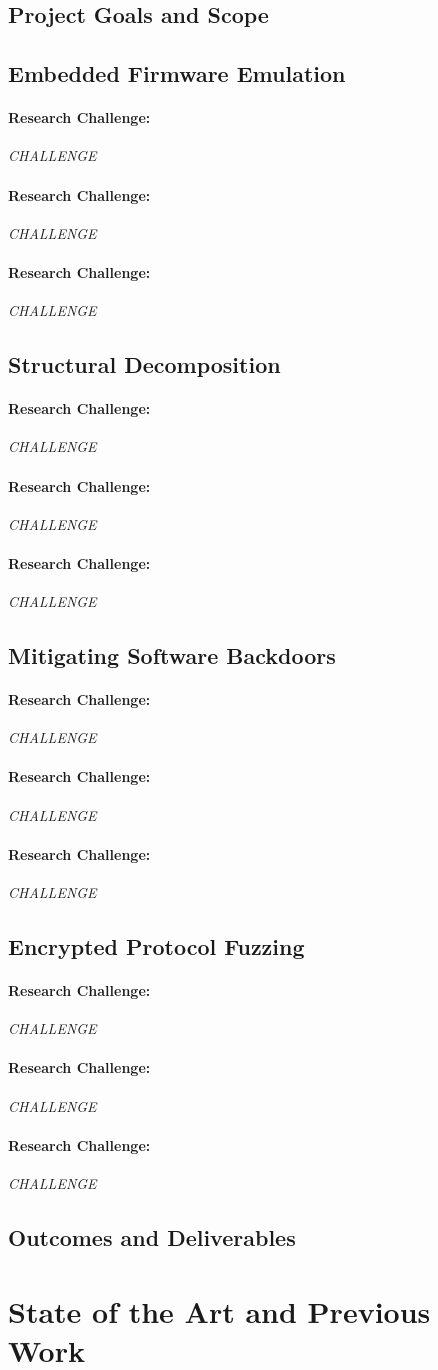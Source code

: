 \documentclass[letterpaper,twoside,11pt,headings=small]{scrartcl}
\newcommand{\challenge}[1]{\paragraph{Research Challenge:} \emph{#1}}
\begin{document}
\subsection{Project Goals and Scope}
\label{sec:overview:goals}

\subsection{Embedded Firmware Emulation}
\label{sec:overview:firmware}

\challenge{CHALLENGE}

\challenge{CHALLENGE}

\challenge{CHALLENGE}

\subsection{Structural Decomposition}
\label{sec:overview:structure}

\challenge{CHALLENGE}

\challenge{CHALLENGE}

\challenge{CHALLENGE}

\subsection{Mitigating Software Backdoors}
\label{sec:overview:backdoors}

\challenge{CHALLENGE}

\challenge{CHALLENGE}

\challenge{CHALLENGE}

\subsection{Encrypted Protocol Fuzzing}
\label{sec:overview:fuzzing}

\challenge{CHALLENGE}

\challenge{CHALLENGE}

\challenge{CHALLENGE}

\subsection{Outcomes and Deliverables}
\label{sec:overview:outcomes}

\section{State of the Art and Previous Work}
\label{sec:related}
\end{document}

